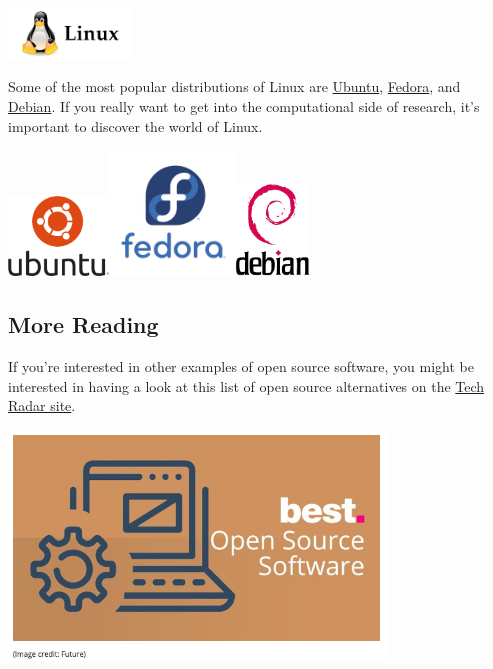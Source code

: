 \documentclass[
]{book}
\begin{document}
\href{https://www.linux.org}{\includegraphics[width=0.25\textwidth,height=\textheight]{images/linux.jpg}}

Some of the most popular distributions of Linux are \href{https://ubuntu.com}{Ubuntu}, \href{https://getfedora.org/en/workstation/download/}{Fedora}, and \href{https://www.debian.org}{Debian}. If you really want to get into the computational side of research, it's important to discover the world of Linux.

\href{https://ubuntu.com}{\includegraphics[width=0.2\textwidth,height=\textheight]{images/ubuntu-logo112.png}}\href{(https://getfedora.org/en/workstation/download/)}{\includegraphics[width=0.25\textwidth,height=\textheight]{images/Fedora-Logo.jpg}}\href{https://www.debian.org}{\includegraphics[width=0.15\textwidth,height=\textheight]{images/openlogo.ps.jpg}}

\hypertarget{more-reading}{%
\subsection{More Reading}\label{more-reading}}

If you're interested in other examples of open source software, you might be interested in having a look at this list of open source alternatives on the \href{https://www.techradar.com/uk/best/best-open-source-software}{Tech Radar site}.

\href{https://www.techradar.com/uk/best/best-open-source-software}{\includegraphics[width=0.75\textwidth,height=\textheight]{images/oss.png}}
\end{document}
